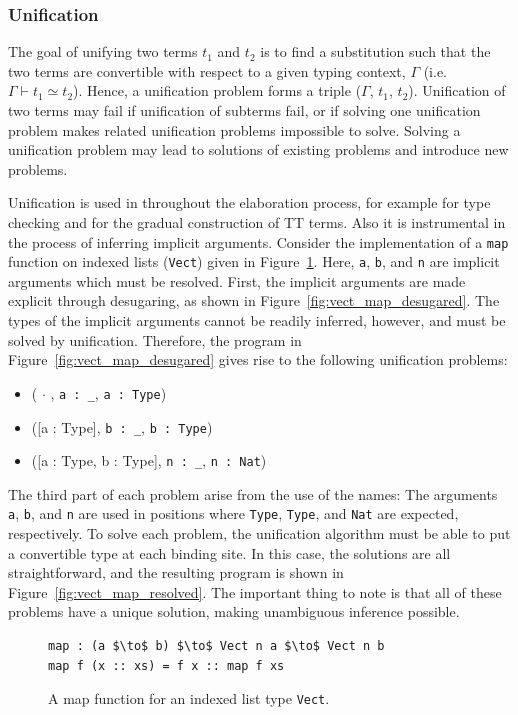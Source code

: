 \subsubsection{Unification}
The goal of unifying two terms $t_{1}$ and $t_{2}$ is to find a substitution
such that the two terms are convertible with respect to a given typing context,
$\Gamma$ (i.e. $\Gamma\vdash t_{1} \simeq t_{2}$). Hence, a unification problem
forms a triple ($\Gamma$, $t_{1}$, $t_{2}$). Unification of two terms may fail
if unification of subterms fail, or if solving one unification problem makes
related unification problems impossible to solve. Solving a unification problem
may lead to solutions of existing problems and introduce new problems.

Unification is used in throughout the elaboration process, for example for type checking
and for the gradual construction of TT terms. Also it is instrumental in the
process of inferring implicit arguments. Consider the implementation of a
\texttt{map} function on indexed lists (\texttt{Vect}) given in
Figure~\ref{fig:vect_map}. Here, \texttt{a}, \texttt{b}, and \texttt{n} are
implicit arguments which must be resolved. First, the implicit arguments are
made explicit through desugaring, as shown in
Figure~\ref{fig:vect_map_desugared}. The types of the implicit arguments cannot
be readily inferred, however, and must be solved by unification. Therefore, the
program in Figure~\ref{fig:vect_map_desugared} gives rise to the following
unification problems:
\begin{itemize}
\item ($\,\cdot\,$, \texttt{a : \_}, \texttt{a : Type})
\item ([a : Type], \texttt{b : \_}, \texttt{b : Type})
\item ([a : Type, b : Type], \texttt{n : \_}, \texttt{n : Nat})
\end{itemize}
The third part of each problem arise from the use of the names: The arguments
\texttt{a}, \texttt{b}, and \texttt{n} are used in positions where
\texttt{Type}, \texttt{Type}, and \texttt{Nat} are expected, respectively. To
solve each problem, the unification algorithm must be able to put a convertible
type at each binding site. In this case, the solutions are all straightforward,
and the resulting program is shown in Figure~\ref{fig:vect_map_resolved}. The
important thing to note is that all of these problems have a unique solution,
making unambiguous inference possible.

\begin{figure}
\begin{lstlisting}[mathescape]
map : (a $\to$ b) $\to$ Vect n a $\to$ Vect n b
map f (x :: xs) = f x :: map f xs
\end{lstlisting}
  \caption{A map function for an indexed list type \texttt{Vect}.}
  \label{fig:vect_map}
\end{figure}

